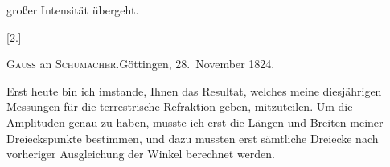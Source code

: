 großer Intensität übergeht.
\begin{center}
[2.]\par{}\par\bigskip
\textsc{Gauss} an \textsc{Schumacher}.\quad Göttingen, 28.~November 1824.
\end{center}
\par\noindent\hspace*{\parindent}Erst heute bin ich imstande, Ihnen das Resultat, welches meine diesjährigen Messungen für die terrestrische Refraktion geben, mitzuteilen. Um
die Amplituden genau zu haben, musste ich erst die Längen und Breiten
meiner Dreieckspunkte bestimmen, und dazu mussten erst sämtliche Dreiecke nach vorheriger Ausgleichung der Winkel berechnet werden.

